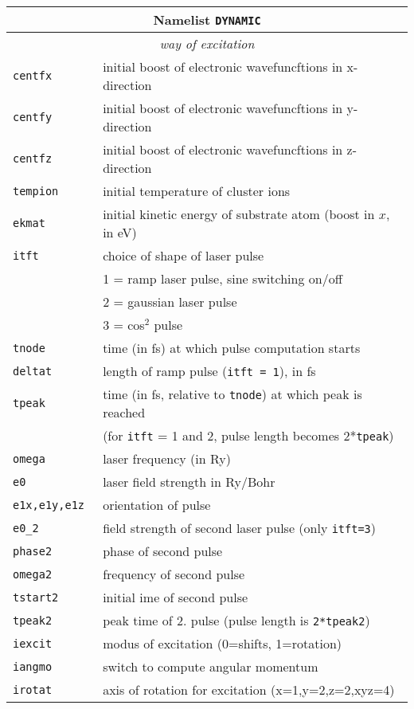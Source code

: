 \documentclass[12pt]{article}
\begin{document}
\begin{tabular}{ll}
\hline
\multicolumn{2}{c}{Namelist {\tt DYNAMIC}} in {\tt for005.<name>} \\
\hline
\multicolumn{2}{c}{\it way of excitation} \\
\hline
{\tt centfx           }& initial boost of electronic wavefuncftions in x-direction\\
{\tt centfy           }& initial boost of electronic wavefuncftions in y-direction\\
{\tt centfz           }& initial boost of electronic wavefuncftions in z-direction\\
{\tt tempion          }& initial temperature of cluster ions \\
{\tt ekmat} & initial kinetic energy of substrate atom (boost in $x$, in eV)\\
{\tt itft   }& choice of shape of laser pulse \\
&   1 = ramp laser pulse, sine switching on/off\\
&   2 = gaussian laser pulse \\
&   3 = cos$^2$ pulse\\
{\tt tnode  }& time (in fs) at which pulse computation starts\\
{\tt deltat }& length of ramp pulse ({\tt itft = 1}), in fs\\
{\tt tpeak  }& time (in fs, relative to {\tt tnode}) at which peak is reached\\
& (for {\tt itft} = 1 and 2, pulse length becomes 2*{\tt tpeak})\\
{\tt omega  }& laser frequency (in Ry)\\
{\tt e0     }& laser field strength in Ry/Bohr\\
{\tt e1x,e1y,e1z   }& orientation of pulse\\
{\tt e0\_2  }& field strength of second laser pulse (only {\tt itft=3}) \\
{\tt phase2 }& phase of second pulse \\
{\tt omega2 }& frequency of second pulse\\
{\tt tstart2}& initial ime of second pulse\\
{\tt tpeak2} & peak time of 2. pulse (pulse length is {\tt 2*tpeak2})\\
{\tt iexcit} & modus of excitation (0=shifts, 1=rotation)\\
{\tt iangmo} & switch to compute angular momentum\\
{\tt irotat} & axis of rotation for excitation (x=1,y=2,z=2,xyz=4)\\

\end{tabular}
\end{document}
